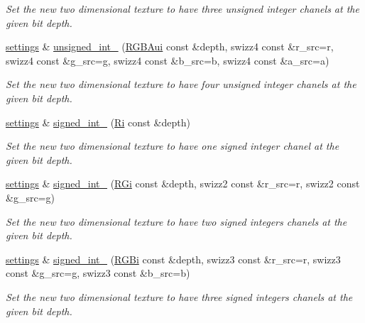 \begin{DoxyCompactItemize}
\begin{DoxyCompactList}\small\item\em Set the new two dimensional texture to have three unsigned integer chanels at the given bit depth. \end{DoxyCompactList}\item 
\hyperlink{classgfx_1_1texture__2D_1_1settings}{settings} \& \hyperlink{classgfx_1_1texture__2D_1_1settings_addfeab597f63abec882322c3f3b1ea6a}{unsigned\-\_\-int\-\_} (\hyperlink{classgfx_1_1RGBAui}{R\-G\-B\-Aui} const \&depth, swizz4 const \&r\-\_\-src=r, swizz4 const \&g\-\_\-src=g, swizz4 const \&b\-\_\-src=b, swizz4 const \&a\-\_\-src=a)
\begin{DoxyCompactList}\small\item\em Set the new two dimensional texture to have four unsigned integer chanels at the given bit depth. \end{DoxyCompactList}\item 
\hyperlink{classgfx_1_1texture__2D_1_1settings}{settings} \& \hyperlink{classgfx_1_1texture__2D_1_1settings_aa1cd3cd7d475baa470283cb525b4b57b}{signed\-\_\-int\-\_} (\hyperlink{classgfx_1_1Ri}{Ri} const \&depth)
\begin{DoxyCompactList}\small\item\em Set the new two dimensional texture to have one signed integer chanel at the given bit depth. \end{DoxyCompactList}\item 
\hyperlink{classgfx_1_1texture__2D_1_1settings}{settings} \& \hyperlink{classgfx_1_1texture__2D_1_1settings_a450ca4ef9e0669a5555ab2163a7d665d}{signed\-\_\-int\-\_} (\hyperlink{classgfx_1_1RGi}{R\-Gi} const \&depth, swizz2 const \&r\-\_\-src=r, swizz2 const \&g\-\_\-src=g)
\begin{DoxyCompactList}\small\item\em Set the new two dimensional texture to have two signed integers chanels at the given bit depth. \end{DoxyCompactList}\item 
\hyperlink{classgfx_1_1texture__2D_1_1settings}{settings} \& \hyperlink{classgfx_1_1texture__2D_1_1settings_af08c8a992133cf99f97d3477ea1b6e7a}{signed\-\_\-int\-\_} (\hyperlink{classgfx_1_1RGBi}{R\-G\-Bi} const \&depth, swizz3 const \&r\-\_\-src=r, swizz3 const \&g\-\_\-src=g, swizz3 const \&b\-\_\-src=b)
\begin{DoxyCompactList}\small\item\em Set the new two dimensional texture to have three signed integers chanels at the given bit depth. \end{DoxyCompactList}\item 

\end{DoxyCompactItemize}
